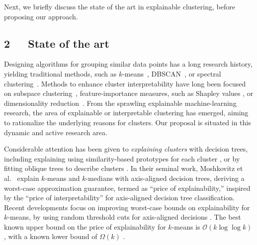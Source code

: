 \documentclass[a4paper,11pt]{article}
\begin{document}
\vspace{-2mm}
\noindent
Next, we briefly discuss the state of the art in explainable clustering, before proposing our approach.

\subsection*{2~~~State of the art}


Designing algorithms for grouping similar data points has a long research history,
yielding traditional methods, 
such as $k$-means~\cite{macqueen1967some}, 
DBSCAN~\cite{ester1996ada}, or spectral clustering~\cite{ng2001spectral}.
Methods to enhance cluster interpretability have long been focused on subspace clustering~\cite{rubinstein2010dict}, 
feature-importance measures, such as Shapley values \cite{lundberg2017unified}, 
or dimensionality reduction~\cite{hinton2002tsne,mcinnes2018umap}.
From the sprawling explainable machine-learning research, the area of explainable or interpretable clustering has emerged, aiming to rationalize the underlying reasons for clusters. 
Our proposal is situated in this dynamic and active research area. 

Considerable attention has been given to \emph{explaining clusters} with decision trees,
including explaining using similarity-based prototypes for each cluster \cite{carrizosa2022interpreting}, 
or by fitting oblique trees to describe clusters \cite{gabidolla2022optimal}.
In their seminal work, Moshkovitz et al.~\cite{moshkovitz2020explainable} 
explain $k$-means and $k$-medians with axis-aligned decision trees, 
deriving a worst-case approximation guarantee, termed as ``price of explainability,'' 
inspired by the ``price of interpretability'' \cite{bertsimas2019price} for axis-aligned decision tree classification. 
Recent developments focus on improving worst-case bounds on explainability for $k$-means, 
by using random threshold cuts for axis-aligned decisions 
\cite{esfandiari2022almost, makarychev2022explainable}. 
The best known upper bound on the price of explainability for $k$-means is 
$\mathcal{O}(k \log \log k)$ \cite{gupta2023price}, 
with a known lower bound of $\Omega(k)$ \cite{gamlath2021explainable}.
\end{document}
